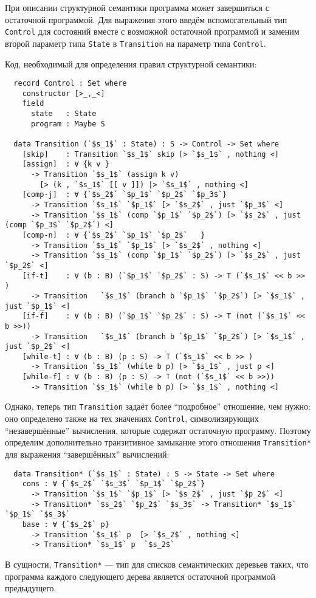 \documentclass[aps,12pt,final,oneside,onecolumn,musixtex,superscriptaddress,centertags]{article}
\newcommand{\lcode}[1]{\lstinline[basicstyle=\ttfamily\normalsize]{#1}}
\begin{document}
  При описании структурной семантики программа может завершиться с остаточной программой. Для выражения этого введём вспомогательный тип \lcode{Control} для состояний вместе с возможной остаточной программой и заменим второй параметр типа \lcode{State} в \lcode{Transition} на параметр типа \lcode{Control}.

  Код, необходимый для определения правил структурной семантики:
  \begin{lstlisting}
  record Control : Set where
    constructor [>_,_<]
    field
      state   : State
      program : Maybe S

  data Transition (`$s_1$` : State) : S -> Control -> Set where
    [skip]    : Transition `$s_1$` skip [> `$s_1$` , nothing <]
    [assign]  : ∀ {k v }
      -> Transition `$s_1$` (assign k v)
        [> (k , `$s_1$` [[ v ]]) |> `$s_1$` , nothing <]
    [comp-j]  : ∀ {`$s_2$` `$p_1$` `$p_2$` `$p_3$`}
      -> Transition `$s_1$` `$p_1$` [> `$s_2$` , just `$p_3$` <]
      -> Transition `$s_1$` (comp `$p_1$` `$p_2$`) [> `$s_2$` , just (comp `$p_3$` `$p_2$`) <]
    [comp-n]  : ∀ {`$s_2$` `$p_1$` `$p_2$`   }
      -> Transition `$s_1$` `$p_1$` [> `$s_2$` , nothing <]
      -> Transition `$s_1$` (comp `$p_1$` `$p_2$`) [> `$s_2$` , just `$p_2$` <]
    [if-t]    : ∀ (b : B) (`$p_1$` `$p_2$` : S) -> T (`$s_1$` << b >> )
      -> Transition   `$s_1$` (branch b `$p_1$` `$p_2$`) [> `$s_1$` , just `$p_1$` <]
    [if-f]    : ∀ (b : B) (`$p_1$` `$p_2$` : S) -> T (not (`$s_1$` << b >>))
      -> Transition   `$s_1$` (branch b `$p_1$` `$p_2$`) [> `$s_1$` , just `$p_2$` <]
    [while-t] : ∀ (b : B) (p : S) -> T (`$s_1$` << b >> )
      -> Transition `$s_1$` (while b p) [> `$s_1$` , just p <]
    [while-f] : ∀ (b : B) (p : S) -> T (not (`$s_1$` << b >>))
      -> Transition `$s_1$` (while b p) [> `$s_1$` , nothing <]
  \end{lstlisting}

  Однако, теперь тип \lcode{Transition} задаёт более ``подробное'' отношение, чем нужно: оно определено также на тех значениях \lcode{Control}, символизирующих ``незавершённые'' вычисления, которые содержат остаточную программу. Поэтому определим дополнительно транзитивное замыкание этого отношения \lcode{Transition*} для выражения ``завершённых'' вычислений:
  \begin{lstlisting}
  data Transition* (`$s_1$` : State) : S -> State -> Set where
    cons : ∀ {`$s_2$` `$s_3$` `$p_1$` `$p_2$`}
      -> Transition `$s_1$` `$p_1$` [> `$s_2$` , just `$p_2$` <]
      -> Transition* `$s_2$` `$p_2$` `$s_3$` -> Transition* `$s_1$` `$p_1$` `$s_3$`
    base : ∀ {`$s_2$` p}
      -> Transition `$s_1$` p  [> `$s_2$` , nothing <]
      -> Transition* `$s_1$` p  `$s_2$`
  \end{lstlisting}
  В сущности, \lcode{Transition*} --- тип для списков семантических деревьев таких, что программа каждого следующего дерева является остаточной программой предыдущего.
\end{document}
